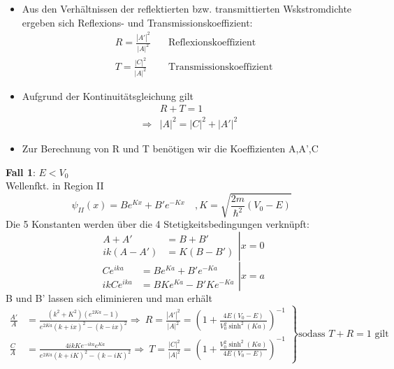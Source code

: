 \documentclass[10pt,article,colorback,accentcolor=tud9d]{scrartcl}
\begin{document}
\begin{itemize}
	\item Aus den Verhältnissen der reflektierten bzw. transmittierten Wskstromdichte ergeben sich Reflexions- und Transmissionskoeffizient: 
    \begin{align}
      &R=\frac{|A'|^2}{|A|^2} \quad &\text{Reflexionskoeffizient}\\
      &T=\frac{|C|^2}{|A|^2} \quad &\text{Transmissionskoeffizient}
    \end{align}
  \item Aufgrund der Kontinuitätsgleichung gilt
    \begin{align}
    &R+T=1\\
    \Rightarrow &|A|^2=|C|^2+|A'|^2
    \end{align}
  \item Zur Berechnung von R und T benötigen wir die Koeffizienten A,A',C
\end{itemize}
\textbf{Fall 1}: $E<V_0$\\
  Wellenfkt. in Region II
  \begin{equation}
  \psi_{II}(x)=Be^{Kx}+B'e^{-Kx}\quad, K=\sqrt{\frac{2m}{\hbar^2}(V_0-E)}
  \end{equation}
  Die 5 Konstanten werden über die 4 Stetigkeitsbedingungen verknüpft:
  \begin{equation}
  \left.
  \begin{aligned}
  A+A'&=B+B'\\
  ik(A-A')&=K(B-B')
  \end{aligned}
  \right|x=0
  \end{equation}
  \begin{equation}
  \left.
  \begin{aligned}
  Ce^{ika}&=Be^{Ka}+B'e^{-Ka}\\
  ikCe^{ika}&=BKe^{Ka}-B'Ke^{-Ka}
  \end{aligned}
  \right|x=a
  \end{equation}
  B und B' lassen sich eliminieren und man erhält 
  \begin{equation}
  \left.
  \begin{aligned}
  \frac{A'}{A}&=\frac{(k^2+K^2)(e^{2Ka}-1)}{e^{2Ka}(k+ix)^2-(k-ix)^2}\Rightarrow\ R=\frac{|A'|^2}{|A|^2}=\left(1+\frac{4E(V_0-E)}{V_0^2\sinh^2(Ka)}\right)^{-1}\\
    \frac{C}{A}&=\frac{4ikKe^{-ika}e^{Ka}}{e^{2Ka}(k+iK)^2-(k-iK)^2}\Rightarrow\ T=\frac{|C|^2}{|A|^2}=\left(1+\frac{V_0^2\sinh^2(Ka)}{4E(V_0-E)}\right)^{-1}
    \end{aligned}
    \right\}\text{sodass $T+R=1$ gilt}
  \end{equation}
\end{document}
